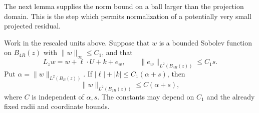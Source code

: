 The next lemma supplies the norm bound on a ball larger than the
projection domain.  This is the step which permits normalization
of a potentially very small projected residual.

\begin{lemma}
\label{pi:radial-transport}
Work in the rescaled units above.  Suppose that $w$ is a bounded
Sobolev function on $B_{4R}(z)$ with $\|w\|_\infty\le C_1$,
and that
\begin{equation}
 L_zw=w+\ell\cdot U+k+e_w,
 \qquad \|e_w\|_{L^2(B_{4R}(z))}\le C_1s.
 \label{pi:transport-hypothesis}
\end{equation}
Put $\alpha=\|w\|_{L^2(B_R(z))}$.  If
$|\ell|+|k|\le C_1(\alpha+s)$, then
\begin{equation}
 \|w\|_{L^2(B_{2R}(z))}\le C(\alpha+s),
 \label{pi:transport-conclusion}
\end{equation}
where $C$ is independent of $\alpha,s$.  The constants may depend
on $C_1$ and the already fixed radii and coordinate bounds.
\end{lemma}


